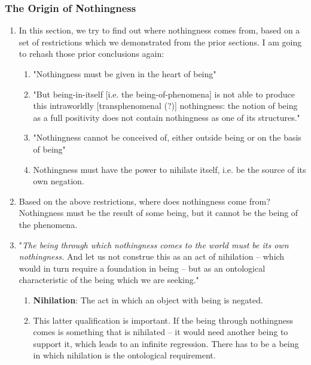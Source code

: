 \subsubsection{The Origin of Nothingness}

\begin{enumerate}
  \subsubsection*{The Origin of Nothingness in the Human Being}
  \item In this section, we try to find out where nothingness comes from, based on a set of restrictions which we demonstrated from the prior sections. I am going to rehash those prior conclusions again:
  \begin{enumerate}
    \item "Nothingness must be given in the heart of being"
    \item "But being-in-itself [i.e. the being-of-phenomena] is not able to produce this intraworldly [transphenomenal (?)] nothingness: the notion of being as a full positivity does not contain nothingness as one of its structures."
    \item "Nothingness cannot be conceived of, either outside being or on the basis of being" \autocite[57]{sartre}
    \item Nothingness must have the power to nihilate itself, i.e. be the source of its own negation.
  \end{enumerate}
  \item Based on the above restrictions, where does nothingness come from? Nothingness must be the result of some being, but it cannot be the being of the phenomena.
  \item "\emph{The being through which nothingness comes to the world must be its own nothingness.} And let us not construe this as an act of nihilation -- which would in turn require a foundation in being -- but as an ontological characteristic of the being which we are seeking."
  \begin{enumerate}
    \item \textbf{Nihilation}: The act in which an object with being is negated.
    \item This latter qualification is important. If the being through nothingness comes is something that is nihilated -- it would need another being to support it, which leads to an infinite regression. There has to be a being in which nihilation is the ontological requirement.
  \end{enumerate}

\end{enumerate}
